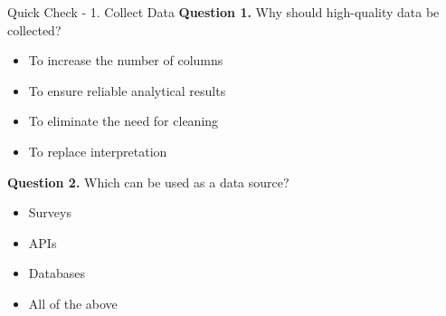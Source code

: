 \documentclass[aspectratio=169,11pt]{beamer}
\begin{document}
\begin{frame}[allowframebreaks]{Quick Check - 1. Collect Data}
\footnotesize
\textbf{Question 1.} Why should high-quality data be collected?\par\medskip
\begin{itemize}
\item[\textbf{A.}] To increase the number of columns
\item[\textbf{B.}] To ensure reliable analytical results
\item[\textbf{C.}] To eliminate the need for cleaning
\item[\textbf{D.}] To replace interpretation
\end{itemize}
\textbf{Question 2.} Which can be used as a data source?\par\medskip
\begin{itemize}
\item[\textbf{A.}] Surveys
\item[\textbf{B.}] APIs
\item[\textbf{C.}] Databases
\item[\textbf{D.}] All of the above
\end{itemize}
\end{frame}
\end{document}
